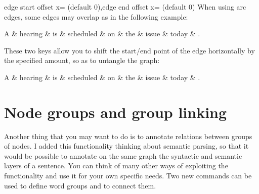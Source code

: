 \documentclass[a4paper]{ltxdoc}
\begin{document}
\begin{keylist}[/depgraph]{edge start offset x= (default 0),edge end offset x= (default 0)}
   When using arc edges, some edges may overlap as in the following example:
\begin{codeexample}[]
\begin{dependency}[theme = simple]
   \begin{deptext}[column sep=1em]
      A \& hearing \& is \& scheduled \& on \& the \& issue \& today \& . \\
   \end{deptext}
\end{dependency}
\end{codeexample}

These two keys allow you to shift the start/end point of the edge horizontally by the specified amount, so as to untangle the graph:

\begin{codeexample}[]
\begin{dependency}[theme = simple]
   \begin{deptext}[column sep=1em]
      A \& hearing \& is \& scheduled \& on \& the \& issue \& today \& . \\
   \end{deptext}
\end{dependency}
\end{codeexample}

\end{keylist}

\section{Node groups and group linking}

Another thing that you may want to do is to annotate relations between groups of nodes. I added this functionality thinking about semantic parsing, so that it would be possible to annotate on the same graph the syntactic and semantic layers of a sentence. You can think of many other ways of exploiting the functionality and use it for your own specific needs. Two new commands can be used to define word groups and to connect them.
\end{document}
